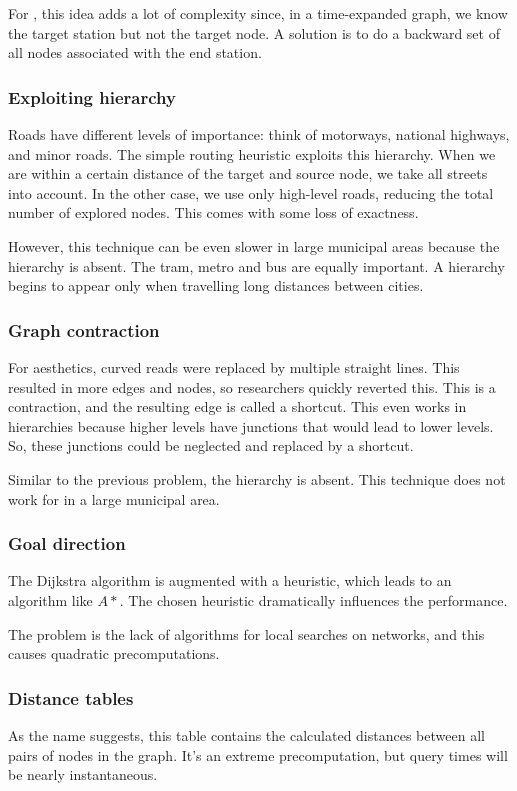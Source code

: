 For , this idea adds a lot of complexity since, in a time-expanded graph, we know the target station but not the target node. A solution is to do a backward set of all nodes associated with the end station.
\subsubsection{Exploiting hierarchy}
Roads have different levels of importance: think of motorways, national highways, and minor roads. The simple routing heuristic exploits this hierarchy. When we are within a certain distance of the target and source node, we take all streets into account. In the other case, we use only high-level roads, reducing the total number of explored nodes. This comes with some loss of exactness.

However, this technique can be even slower in large municipal areas because the hierarchy is absent. The tram, metro and bus are equally important. A hierarchy begins to appear only when travelling long distances between cities. 
\subsubsection{Graph contraction}
For aesthetics, curved reads were replaced by multiple straight lines. This resulted in more edges and nodes, so researchers quickly reverted this. This is a contraction, and the resulting edge is called a shortcut. This even works in hierarchies because higher levels have junctions that would lead to lower levels. So, these junctions could be neglected and replaced by a shortcut. 

Similar to the previous problem, the hierarchy is absent. This technique does not work for  in a large municipal area.
\subsubsection{Goal direction}
The Dijkstra algorithm is augmented with a heuristic, which leads to an algorithm like $ A*$. The chosen heuristic dramatically influences the performance.

The problem is the lack of algorithms for local searches on  networks, and this causes quadratic precomputations.
\subsubsection{Distance tables}
As the name suggests, this table contains the calculated distances between all pairs of nodes in the graph. It’s an extreme precomputation, but query times will be nearly instantaneous. 

